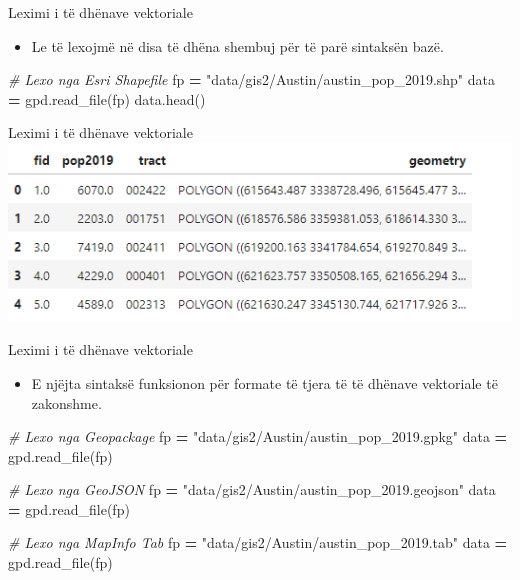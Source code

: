 \documentclass[
  ignorenonframetext,
]{beamer}
\newenvironment{Shaded}{\begin{snugshade}}{\end{snugshade}}
\newcommand{\CommentTok}[1]{\textcolor[rgb]{0.56,0.35,0.01}{\textit{#1}}}
\newcommand{\NormalTok}[1]{#1}
\newcommand{\OperatorTok}[1]{\textcolor[rgb]{0.81,0.36,0.00}{\textbf{#1}}}
\newcommand{\StringTok}[1]{\textcolor[rgb]{0.31,0.60,0.02}{#1}}
\providecommand{\tightlist}{%
  \setlength{\itemsep}{0pt}\setlength{\parskip}{0pt}}
\begin{document}
\begin{frame}[fragile]{Leximi i të dhënave vektoriale}
\protect\hypertarget{leximi-i-tuxeb-dhuxebnave-vektoriale-4}{}
\begin{itemize}
\tightlist
\item
  Le të lexojmë në disa të dhëna shembuj për të parë sintaksën bazë.
\end{itemize}


\begin{Shaded}
\begin{Highlighting}[]
\CommentTok{\# Lexo nga Esri Shapefile}
\NormalTok{fp }\OperatorTok{=} \StringTok{"data/gis2/Austin/austin\_pop\_2019.shp"}
\NormalTok{data }\OperatorTok{=}\NormalTok{ gpd.read\_file(fp)}
\NormalTok{data.head()}
\end{Highlighting}
\end{Shaded}
\end{frame}

\begin{frame}{Leximi i të dhënave vektoriale}
\protect\hypertarget{leximi-i-tuxeb-dhuxebnave-vektoriale-5}{}
\includegraphics{./Figs/fiona1.png}
\end{frame}

\begin{frame}[fragile]{Leximi i të dhënave vektoriale}
\protect\hypertarget{leximi-i-tuxeb-dhuxebnave-vektoriale-6}{}
\begin{itemize}
\tightlist
\item
  E njëjta sintaksë funksionon për formate të tjera të të dhënave
  vektoriale të zakonshme.
\end{itemize}


\begin{Shaded}
\begin{Highlighting}[]
\CommentTok{\# Lexo nga Geopackage}
\NormalTok{fp }\OperatorTok{=} \StringTok{"data/gis2/Austin/austin\_pop\_2019.gpkg"}
\NormalTok{data }\OperatorTok{=}\NormalTok{ gpd.read\_file(fp)}

\CommentTok{\# Lexo nga GeoJSON}
\NormalTok{fp }\OperatorTok{=} \StringTok{"data/gis2/Austin/austin\_pop\_2019.geojson"}
\NormalTok{data }\OperatorTok{=}\NormalTok{ gpd.read\_file(fp)}

\CommentTok{\# Lexo nga MapInfo Tab}
\NormalTok{fp }\OperatorTok{=} \StringTok{"data/gis2/Austin/austin\_pop\_2019.tab"}
\NormalTok{data }\OperatorTok{=}\NormalTok{ gpd.read\_file(fp)}
\end{Highlighting}
\end{Shaded}
\end{frame}
\end{document}
